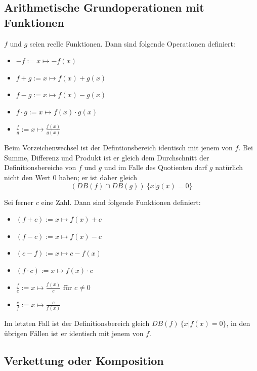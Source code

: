 \documentclass[10pt,a4paper]{article}
\begin{document}
\subsection{Arithmetische Grundoperationen mit Funktionen}

$f$ und $g$ seien reelle Funktionen. Dann sind folgende Operationen definiert:
\begin{itemize}
\item $\displaystyle -f := x \mapsto -f(x)$
\item $\displaystyle f + g := x \mapsto f(x) + g(x)$
\item $\displaystyle f - g := x \mapsto f(x) - g(x)$
\item $\displaystyle f \cdot g := x \mapsto f(x) \cdot g(x)$
\item $\displaystyle \frac{f}{g} := x \mapsto \frac{f(x)}{g(x)}$
\end{itemize}

Beim Vorzeichenwechsel ist der Defintionsbereich identisch mit jenem von $f$. Bei Summe, Differenz und Produkt ist er gleich dem Durchschnitt der Definitionsbereiche von $f$ und $g$ und im Falle des Quotienten darf $g$ natürlich nicht den Wert $0$ haben; er ist daher gleich
$$\displaystyle (DB(f) \cap DB(g)) \ \{x|g(x) = 0\}$$

Sei ferner $c$ eine Zahl. Dann sind folgende Funktionen definiert:

\begin{itemize}
\item $\displaystyle (f + c) := x \mapsto f(x) + c$
\item $\displaystyle (f - c) := x \mapsto f(x) - c$
\item $\displaystyle (c - f) := x \mapsto c - f(x)$
\item $\displaystyle (f \cdot c) := x \mapsto f(x) \cdot c$
\item $\displaystyle \frac{f}{c} := x \mapsto \frac{f(x)}{c} \textrm{ für } c \neq 0$
\item $\displaystyle \frac{c}{f} := x \mapsto \frac{c}{f(x)}$
\end{itemize}

Im letzten Fall ist der Definitionsbereich gleich $DB(f) \ \{x|f(x) = 0 \}$, in den übrigen Fällen ist er identisch mit jenem von $f$.


\subsection{Verkettung oder Komposition}
\end{document}
